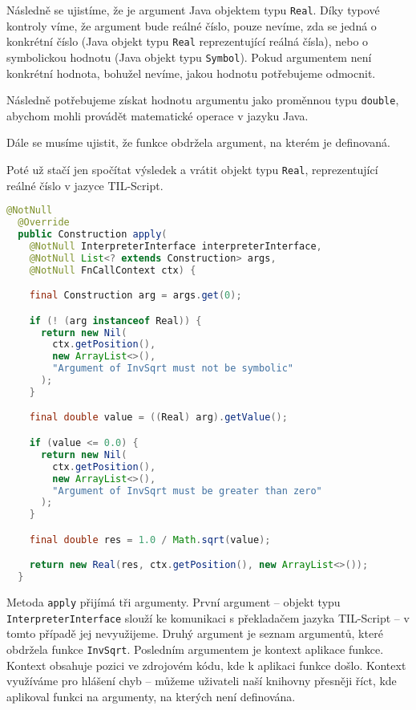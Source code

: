Následně se ujistíme, že je argument Java objektem typu \lstinline{Real}. Díky typové kontroly víme,
že argument bude reálné číslo, pouze nevíme, zda se jedná o konkrétní číslo (Java objekt typu
\lstinline{Real} reprezentující reálná čísla), nebo o symbolickou hodnotu (Java objekt typu
\lstinline{Symbol}). Pokud argumentem není konkrétní hodnota, bohužel nevíme, jakou hodnotu
potřebujeme odmocnit.

Následně potřebujeme získat hodnotu argumentu jako proměnnou typu \lstinline{double}, abychom
mohli provádět matematické operace v jazyku Java.

Dále se musíme ujistit, že funkce obdržela argument, na kterém je definovaná.

Poté už stačí jen spočítat výsledek a vrátit objekt typu \lstinline{Real}, reprezentující reálné
číslo v jazyce TIL-Script.

\begin{lstlisting}[caption={Konstruktor InvSqrt}, language=Java]
  @NotNull
  @Override
  public Construction apply(
    @NotNull InterpreterInterface interpreterInterface,
    @NotNull List<? extends Construction> args,
    @NotNull FnCallContext ctx) {

    final Construction arg = args.get(0);

    if (! (arg instanceof Real)) {
      return new Nil(
        ctx.getPosition(),
        new ArrayList<>(),
        "Argument of InvSqrt must not be symbolic"
      );
    }

    final double value = ((Real) arg).getValue();

    if (value <= 0.0) {
      return new Nil(
        ctx.getPosition(),
        new ArrayList<>(),
        "Argument of InvSqrt must be greater than zero"
      );
    }

    final double res = 1.0 / Math.sqrt(value);

    return new Real(res, ctx.getPosition(), new ArrayList<>());
  }
\end{lstlisting}

Metoda \lstinline{apply} přijímá tři argumenty. První argument -- objekt typu
\lstinline{InterpreterInterface} slouží ke komunikaci s překladačem jazyka TIL-Script -- v tomto
případě jej nevyužijeme. Druhý argument je seznam argumentů, které obdržela funkce
\lstinline{InvSqrt}. Posledním argumentem je kontext aplikace funkce. Kontext obsahuje pozici
ve zdrojovém kódu, kde k aplikaci funkce došlo. Kontext využíváme pro hlášení chyb -- můžeme
uživateli naší knihovny přesněji říct, kde aplikoval funkci na argumenty, na kterých není
definována.

